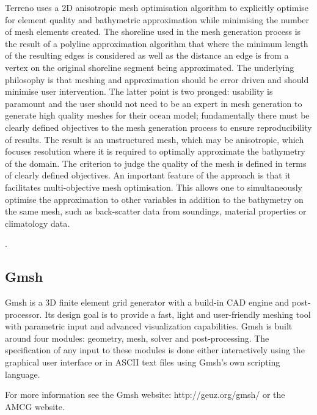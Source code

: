 Terreno uses a 2D anisotropic mesh optimisation algorithm to explicitly optimise for 
element quality and bathymetric approximation while minimising the number of mesh
elements created. The shoreline used in the mesh generation process is the result 
of a polyline approximation algorithm that where the minimum length of the resulting 
edges is considered as well as the distance an edge is from a vertex on the original 
shoreline segment being approximated. The underlying philosophy is that meshing and 
approximation should be error driven and should minimise user intervention. The 
latter point is two pronged: usability is paramount and the user should not need 
to be an expert in mesh generation to generate high quality meshes for their ocean 
model; fundamentally there must be clearly defined objectives to the mesh generation 
process to ensure reproducibility of results. The result is an unstructured mesh, 
which may be anisotropic, which focuses resolution where it is required to optimally 
approximate the bathymetry of the domain. The criterion to judge the quality of the 
mesh is defined in terms of clearly defined objectives. An important feature of the 
approach is that it facilitates multi-objective mesh optimisation. This allows one to 
simultaneously optimise the approximation to other variables in addition to the 
bathymetry on the same mesh, such as back-scatter data from soundings, material 
properties or climatology data. 

\website.

\subsection{Gmsh}

Gmsh is a 3D finite element grid generator with a build-in CAD engine and post-processor.
Its design goal is to provide a fast, light and user-friendly meshing tool with parametric
input and advanced visualization capabilities. Gmsh is built around four modules: geometry, 
mesh, solver and post-processing. The specification of any input to these modules is done
either interactively using the graphical user interface or in ASCII text files using Gmsh's
own scripting language. 

For more information see the Gmsh website: http://geuz.org/gmsh/ or the AMCG website.

